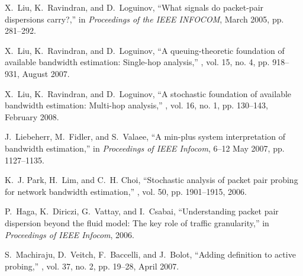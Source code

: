 \documentclass[11pt]{article}
\begin{document}
\begin{thebibliography}{10}
X.~Liu, K.~Ravindran, and D.~Loguinov,
\newblock ``What signals do packet-pair dispersions carry?,''
\newblock in {\em Proceedings of the IEEE INFOCOM}, March 2005, pp. 281--292.

X.~Liu, K.~Ravindran, and D.~Loguinov,
\newblock ``A queuing-theoretic foundation of available bandwidth estimation:
  Single-hop analysis,''
, vol. 15, no. 4, pp.
  918--931, August 2007.

X.~Liu, K.~Ravindran, and D.~Loguinov,
\newblock ``A stochastic foundation of available bandwidth estimation:
  Multi-hop analysis,''
, vol. 16, no. 1, pp.
  130--143, February 2008.

J.~Liebeherr, M.~Fidler, and S.~Valaee,
\newblock ``A min-plus system interpretation of bandwidth estimation,''
\newblock in {\em Proceedings of IEEE Infocom}, 6--12 May 2007, pp. 1127--1135.

K.~J. Park, H.~Lim, and C.~H. Choi,
\newblock ``Stochastic analysis of packet pair probing for network bandwidth
  estimation,''
, vol. 50, pp. 1901--1915, 2006.

P.~Haga, K.~Diriczi, G.~Vattay, and I.~Csabai,
\newblock ``Understanding packet pair dispersion beyond the fluid model: The
  key role of traffic granularity,''
\newblock in {\em Proceedings of IEEE Infocom}, 2006.

S.~Machiraju, D.~Veitch, F.~Baccelli, and J.~Bolot,
\newblock ``Adding definition to active probing,''
, vol. 37, no. 2, pp. 19--28,
  April 2007.

\end{thebibliography}
\end{document}
